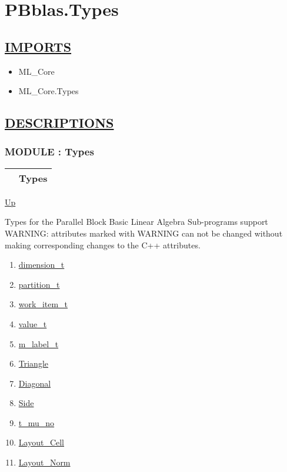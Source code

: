 \chapter*{PBblas.Types}
\hypertarget{ecldoc:toc:PBblas.Types}{}

\section*{\underline{IMPORTS}}
\begin{itemize}
\item ML\_Core
\item ML\_Core.Types
\end{itemize}

\section*{\underline{DESCRIPTIONS}}
\subsection*{MODULE : Types}
\hypertarget{ecldoc:PBblas.Types}{}

{\renewcommand{\arraystretch}{1.5}
\begin{tabularx}{\textwidth}{|>{\raggedright\arraybackslash}l|X|}
\hline
\hspace{0pt} & Types \\
\hline
\end{tabularx}
}

\hyperlink{ecldoc:toc:PBblas}{Up}

\par
Types for the Parallel Block Basic Linear Algebra Sub-programs support WARNING: attributes marked with WARNING can not be changed without making corresponding changes to the C++ attributes.


\begin{enumerate}
\item \hyperlink{ecldoc:pbblas.types.dimension_t}{dimension\_t}
\item \hyperlink{ecldoc:pbblas.types.partition_t}{partition\_t}
\item \hyperlink{ecldoc:pbblas.types.work_item_t}{work\_item\_t}
\item \hyperlink{ecldoc:pbblas.types.value_t}{value\_t}
\item \hyperlink{ecldoc:pbblas.types.m_label_t}{m\_label\_t}
\item \hyperlink{ecldoc:ecldoc-Triangle}{Triangle}
\item \hyperlink{ecldoc:ecldoc-Diagonal}{Diagonal}
\item \hyperlink{ecldoc:ecldoc-Side}{Side}
\item \hyperlink{ecldoc:pbblas.types.t_mu_no}{t\_mu\_no}
\item \hyperlink{ecldoc:pbblas.types.layout_cell}{Layout\_Cell}
\item \hyperlink{ecldoc:pbblas.types.layout_norm}{Layout\_Norm}
\end{enumerate}

